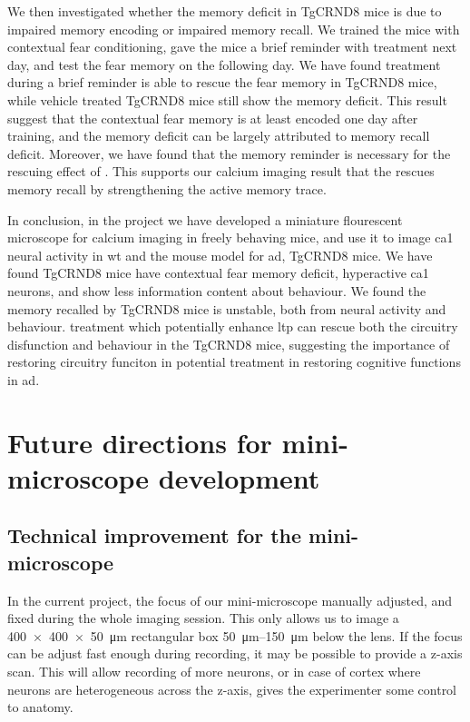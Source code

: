 We then investigated whether the memory deficit in TgCRND8 mice is due to impaired memory encoding or impaired memory recall. We trained the mice with contextual fear conditioning, gave the mice a brief reminder with \tglu treatment next day, and test the fear memory on the following day. We have found \tglu treatment during a brief reminder is able to rescue the fear memory in TgCRND8 mice, while vehicle treated TgCRND8 mice still show the memory deficit. This result suggest that the contextual fear memory is at least encoded one day after training, and the memory deficit can be largely attributed to memory recall deficit. Moreover, we have found that the memory reminder is necessary for the rescuing effect of \tglu. This supports our calcium imaging result that the \tglu rescues memory recall by strengthening the active memory trace. 

In conclusion, in the project we have developed a miniature flourescent microscope for calcium imaging in freely behaving mice, and use it to image \gls{ca1} neural activity in \gls{wt} and the mouse model for \gls{ad}, TgCRND8 mice. We have found TgCRND8 mice have contextual fear memory deficit, hyperactive \gls{ca1} neurons, and show less information content about behaviour. We found the memory recalled by TgCRND8 mice is unstable, both from neural activity and behaviour. \tglu treatment which potentially enhance \gls{ltp} can rescue both the circuitry disfunction and behaviour in the TgCRND8 mice, suggesting the importance of restoring circuitry funciton in potential treatment in restoring cognitive functions in \gls{ad}.

\section{Future directions for mini-microscope development}
\subsection{Technical improvement for the mini-microscope}

In the current project, the focus of our mini-microscope manually adjusted, and fixed during the whole imaging session. This only allows us to image a \SI{400x400x50}{\um} rectangular box \SIrange{50}{150}{\um} below the lens. If the focus can be adjust fast enough during recording, it may be possible to provide a z-axis scan. This will allow recording of more neurons, or in case of cortex where neurons are heterogeneous across the z-axis, gives the experimenter some control to anatomy. 

